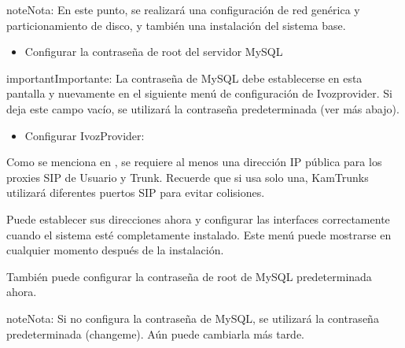 \documentclass[letterpaper,10pt,spanish]{sphinxmanual}
\begin{document}
\noindent{}

\begin{notice}{note}{Nota:}
En este punto, se realizará una configuración de red genérica y particionamiento de disco, y también una instalación del sistema base.
\end{notice}
\begin{itemize}
\item {} 
Configurar la contraseña de root del servidor MySQL

\end{itemize}

\noindent{}

\begin{notice}{important}{Importante:}
La contraseña de MySQL debe establecerse en esta pantalla y nuevamente en el siguiente menú de configuración de Ivozprovider. Si deja este campo vacío, se utilizará la contraseña predeterminada (ver más abajo).
\end{notice}
\begin{itemize}
\item {} 
Configurar IvozProvider:

\end{itemize}

\noindent{}

Como se menciona en {\hyperref[basic_concepts/installation/requirements:requisitos\string-minimos]{}}, se requiere al menos una dirección IP pública para los proxies SIP de Usuario y Trunk. Recuerde que si usa solo una, KamTrunks utilizará diferentes puertos SIP para evitar colisiones.

Puede establecer sus direcciones ahora y configurar las interfaces correctamente cuando el sistema esté completamente instalado. Este menú puede mostrarse en cualquier momento después de la instalación.

\noindent{}

También puede configurar la contraseña de root de MySQL predeterminada ahora.

\begin{notice}{note}{Nota:}
Si no configura la contraseña de MySQL, se utilizará la contraseña predeterminada (changeme). Aún puede cambiarla más tarde.
\end{notice}

\noindent{}
\end{document}
